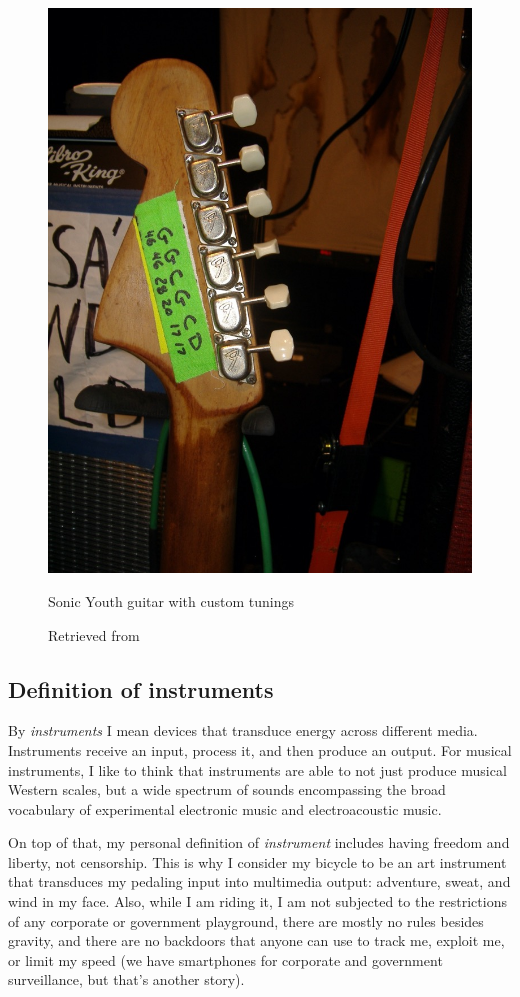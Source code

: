\begin{figure}[ht]
  \centering
  \includegraphics[width=0.75\linewidth,height=0.30\textheight,keepaspectratio]{images/sonic-youth-guitar.jpg}
  \caption{Sonic Youth guitar with custom tunings}
  \caption*{Retrieved from \cite{sonic-youth-illustrated-equipment-guide}}
  \label{fig:sonic-youth-guitar}
\end{figure}

\subsection{Definition of instruments}

By \emph{instruments} I mean devices that transduce energy across different media. Instruments receive an input, process it, and then produce an output. For musical instruments, I like to think that instruments are able to not just produce musical Western scales, but a wide spectrum of sounds encompassing the broad vocabulary of experimental electronic music and electroacoustic music.

On top of that, my personal definition of \emph{instrument} includes having freedom and liberty, not censorship. This is why I consider my bicycle to be an art instrument that transduces my pedaling input into multimedia output: adventure, sweat, and wind in my face. Also, while I am riding it, I am not subjected to the restrictions of any corporate or government playground, there are mostly no rules besides gravity, and there are no backdoors that anyone can use to track me, exploit me, or limit my speed (we have smartphones for corporate and government surveillance, but that's another story).

